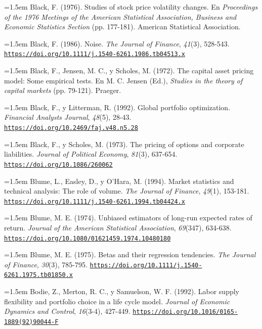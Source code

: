 \documentclass[10pt,a4paper]{article}
\begin{document}
\noindent\hangindent=1.5em Black, F. (1976). Studies of stock price volatility changes. En \textit{Proceedings of the 1976 Meetings of the American Statistical Association, Business and Economic Statistics Section} (pp. 177-181). American Statistical Association.

\noindent\hangindent=1.5em Black, F. (1986). Noise. \textit{The Journal of Finance}, \textit{41}(3), 528-543. \href{https://doi.org/10.1111/j.1540-6261.1986.tb04513.x}{\nolinkurl{https://doi.org/10.1111/j.1540-6261.1986.tb04513.x}}

\noindent\hangindent=1.5em Black, F., Jensen, M. C., y Scholes, M. (1972). The capital asset pricing model: Some empirical tests. En M. C. Jensen (Ed.), \textit{Studies in the theory of capital markets} (pp. 79-121). Praeger.

\noindent\hangindent=1.5em Black, F., y Litterman, R. (1992). Global portfolio optimization. \textit{Financial Analysts Journal}, \textit{48}(5), 28-43. \href{https://doi.org/10.2469/faj.v48.n5.28}{\nolinkurl{https://doi.org/10.2469/faj.v48.n5.28}}

\noindent\hangindent=1.5em Black, F., y Scholes, M. (1973). The pricing of options and corporate liabilities. \textit{Journal of Political Economy}, \textit{81}(3), 637-654. \href{https://doi.org/10.1086/260062}{\nolinkurl{https://doi.org/10.1086/260062}}

\noindent\hangindent=1.5em Blume, L., Easley, D., y O'Hara, M. (1994). Market statistics and technical analysis: The role of volume. \textit{The Journal of Finance}, \textit{49}(1), 153-181. \href{https://doi.org/10.1111/j.1540-6261.1994.tb04424.x}{\nolinkurl{https://doi.org/10.1111/j.1540-6261.1994.tb04424.x}}

\noindent\hangindent=1.5em Blume, M. E. (1974). Unbiased estimators of long-run expected rates of return. \textit{Journal of the American Statistical Association}, \textit{69}(347), 634-638. \href{https://doi.org/10.1080/01621459.1974.10480180}{\nolinkurl{https://doi.org/10.1080/01621459.1974.10480180}}

\noindent\hangindent=1.5em Blume, M. E. (1975). Betas and their regression tendencies. \textit{The Journal of Finance}, \textit{30}(3), 785-795. \href{https://doi.org/10.1111/j.1540-6261.1975.tb01850.x}{\nolinkurl{https://doi.org/10.1111/j.1540-6261.1975.tb01850.x}}

\noindent\hangindent=1.5em Bodie, Z., Merton, R. C., y Samuelson, W. F. (1992). Labor supply flexibility and portfolio choice in a life cycle model. \textit{Journal of Economic Dynamics and Control}, \textit{16}(3-4), 427-449. \href{https://doi.org/10.1016/0165-1889(92)90044-F}{\nolinkurl{https://doi.org/10.1016/0165-1889(92)90044-F}}
\end{document}
